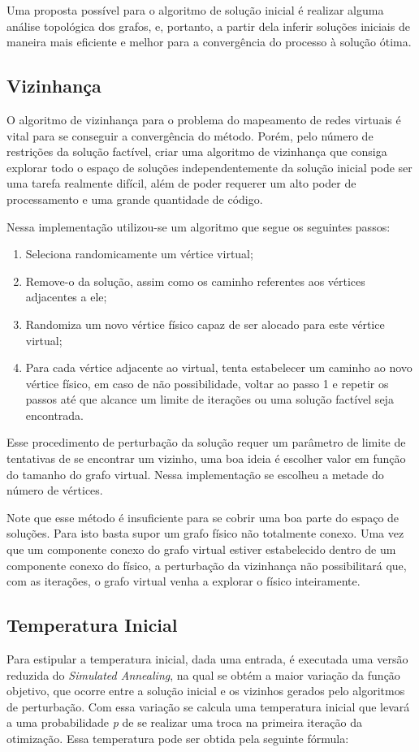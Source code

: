 \documentclass{article}
\begin{document}
Uma proposta possível para o algoritmo de solução inicial é realizar alguma análise topológica dos grafos, e, portanto, a partir dela inferir soluções iniciais de maneira mais eficiente e melhor para a convergência do processo à solução ótima.

\subsection{Vizinhança}
O algoritmo de vizinhança para o problema do mapeamento de redes virtuais é vital para se conseguir a convergência do método. Porém, pelo número de restrições da solução factível, criar uma algoritmo de vizinhança que consiga explorar todo o espaço de soluções independentemente da solução inicial pode ser uma tarefa realmente difícil, além de poder requerer um alto poder de processamento e uma grande quantidade de código.

Nessa implementação utilizou-se um algoritmo que segue os seguintes passos:
\begin{enumerate}
\item Seleciona randomicamente um vértice virtual;
\item Remove-o da solução, assim como os caminho referentes aos vértices adjacentes a ele;
\item Randomiza um novo vértice físico capaz de ser alocado para este vértice virtual;
\item Para cada vértice adjacente ao virtual, tenta estabelecer um caminho ao novo vértice físico, em caso de não possibilidade, voltar ao passo 1 e repetir os passos até que alcance um limite de iterações ou uma solução factível seja encontrada.
\end{enumerate}

Esse procedimento de perturbação da solução requer um parâmetro de limite de tentativas de se encontrar um vizinho, uma boa ideia é escolher valor em função do tamanho do grafo virtual. Nessa implementação se escolheu a metade do número de vértices.

Note que esse método é insuficiente para se cobrir uma boa parte do espaço de soluções. Para isto basta supor um grafo físico não totalmente conexo. Uma vez que um componente conexo do grafo virtual estiver estabelecido dentro de um componente conexo do físico, a perturbação da vizinhança não possibilitará que, com as iterações, o grafo virtual venha a explorar o físico inteiramente.

\subsection{Temperatura Inicial}
Para estipular a temperatura inicial, dada uma entrada, é executada uma versão reduzida do \emph{Simulated Annealing}, na qual se obtém a maior variação da função objetivo, que ocorre entre a solução inicial e os vizinhos gerados pelo algoritmos de perturbação. Com essa variação se calcula uma temperatura inicial que levará a uma probabilidade \emph{p} de se realizar uma troca na primeira iteração da otimização. Essa temperatura pode ser obtida pela seguinte fórmula:
\end{document}
